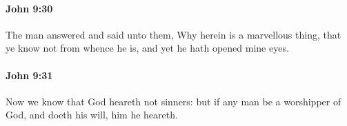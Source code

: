 		\paragraph{John 9:30} %
			\label{JOHN-9-30}

			The man answered and said unto them, Why herein is a marvellous thing, that ye know not from whence he is, and yet he hath opened mine eyes.

			\begin{framed}
			\scriptsize
				\begin{compactdesc}
					\item[SBLG] 
				\end{compactdesc}
			\end{framed}

		\paragraph{John 9:31} %
			\label{JOHN-9-31}

			Now we know that God heareth not sinners: but if any man be a worshipper of God, and doeth his will, him he heareth.

